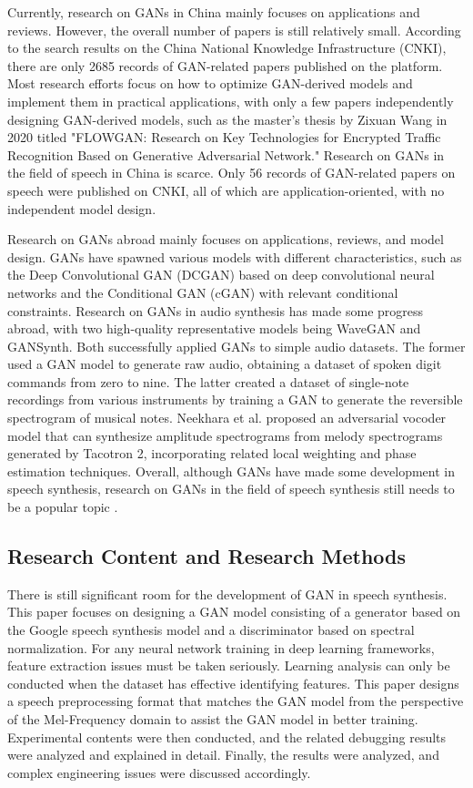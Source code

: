 \documentclass[10pt,journal,compsoc]{IEEEtran}
\begin{document}
Currently, research on GANs in China mainly focuses on applications and reviews. However, the overall number of papers is still relatively small. According to the search results on the China National Knowledge Infrastructure (CNKI), there are only 2685 records of GAN-related papers published on the platform. Most research efforts focus on how to optimize GAN-derived models and implement them in practical applications, with only a few papers independently designing GAN-derived models, such as the master's thesis by Zixuan Wang in 2020 titled "FLOWGAN: Research on Key Technologies for Encrypted Traffic Recognition Based on Generative Adversarial Network." Research on GANs in the field of speech in China is scarce. Only 56 records of GAN-related papers on speech were published on CNKI, all of which are application-oriented, with no independent model design.

Research on GANs abroad mainly focuses on applications, reviews, and model design. GANs have spawned various models with different characteristics, such as the Deep Convolutional GAN (DCGAN) based on deep convolutional neural networks and the Conditional GAN (cGAN) with relevant conditional constraints. Research on GANs in audio synthesis has made some progress abroad, with two high-quality representative models being WaveGAN and GANSynth. Both successfully applied GANs to simple audio datasets. The former used a GAN model to generate raw audio, obtaining a dataset of spoken digit commands from zero to nine. The latter created a dataset of single-note recordings from various instruments by training a GAN to generate the reversible spectrogram of musical notes. Neekhara et al. proposed an adversarial vocoder model that can synthesize amplitude spectrograms from melody spectrograms generated by Tacotron 2, incorporating related local weighting and phase estimation techniques. Overall, although GANs have made some development in speech synthesis, research on GANs in the field of speech synthesis still needs to be a popular topic \cite{4}.

\subsection{Research Content and Research Methods}

There is still significant room for the development of GAN in speech synthesis. This paper focuses on designing a GAN model consisting of a generator based on the Google speech synthesis model and a discriminator based on spectral normalization. For any neural network training in deep learning frameworks, feature extraction issues must be taken seriously. Learning analysis can only be conducted when the dataset has effective identifying features. This paper designs a speech preprocessing format that matches the GAN model from the perspective of the Mel-Frequency domain to assist the GAN model in better training. Experimental contents were then conducted, and the related debugging results were analyzed and explained in detail. Finally, the results were analyzed, and complex engineering issues were discussed accordingly.
\end{document}
